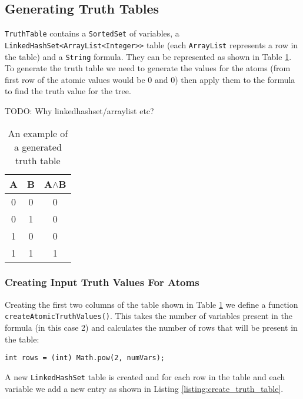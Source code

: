 \documentclass{report}
\begin{document}
\subsection{Generating Truth Tables}

{\tt TruthTable} contains a {\tt SortedSet} of variables, a {\tt LinkedHashSet<ArrayList<Integer>>} table (each {\tt ArrayList} represents a row in the table) and a {\tt String} formula. They can be represented as shown in Table \ref{table:generated_truth_table}. To generate the truth table we need to generate the values for the atoms (from first row of the atomic values would be 0 and 0) then apply them to the formula to find the truth value for the tree.

TODO: Why linkedhashset/arraylist etc?

\begin{table}[h]
  \begin{center}
    \begin{tabular}{ || c | c || c || }
      \hline
      A & B & A$\land$B \\ \hline
      0 & 0 & 0 \\
      0 & 1 & 0 \\
      1 & 0 & 0 \\
      1 & 1 & 1 \\
      \hline
    \end{tabular}
  \end{center}
  \caption{An example of a generated truth table}
  \label{table:generated_truth_table}
\end{table}

\subsubsection{Creating Input Truth Values For Atoms}

Creating the first two columns of the table shown in Table \ref{table:generated_truth_table} we define a function {\tt createAtomicTruthValues()}. This takes the number of variables present in the formula (in this case 2) and calculates the number of rows that will be present in the table:

\begin{listing}[ht]
\begin{verbatim} 
int rows = (int) Math.pow(2, numVars);
\end{verbatim}
\end{listing}

A new {\tt LinkedHashSet} table is created and for each row in the table and each variable we add a new entry as shown in Listing \ref{listing:create_truth_table}.
\end{document}
